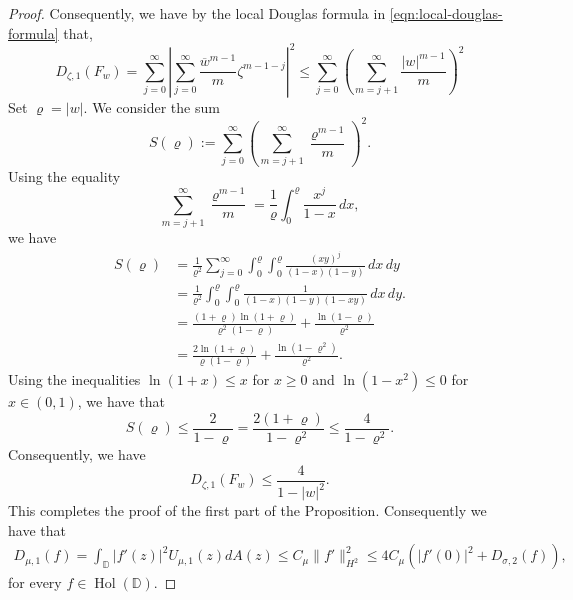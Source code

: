 \documentclass[10pt,oneside,reqno]{amsart}
\theoremstyle{definition}
\theoremstyle{remark}
\newcommand{\abs}[1]{\left\lvert #1 \right\rvert}
\renewcommand{\le}{\leqslant}
\renewcommand{\ge}{\geqslant}
\newcommand{\D}{\mathbb D}
\numberwithin{equation}{section}
\begin{document}
\begin{proof}
Consequently, we have by the local Douglas formula in \eqref{eqn:local-douglas-formula} that,
\begin{equation*}
    D_{\zeta,1}(F_w) =\sum_{j=0}^{\infty} \abs{\sum_{j=0}^{\infty} \frac{\overline{w}^{m-1}}{m} \zeta^{m-1-j}}^2 \le \sum_{j=0}^{\infty} \left( \sum_{m=j+1}^{\infty} \frac{\abs{w}^{m-1}}{m} \right)^2
\end{equation*}
Set $\varrho = |w|$. We consider the sum
\begin{equation*}
    S(\varrho) := \sum_{j=0}^{\infty} \left( \sum_{m=j+1}^{\infty} \frac{\varrho^{m-1}}{m} \right)^2.
\end{equation*}
Using the equality
\begin{equation*}
    \sum_{m=j+1}^{\infty} \frac{\varrho^{m-1}}{m} = \frac{1}{\varrho} \int_{0}^{\varrho} \frac{x^j}{1-x} \, dx,
\end{equation*}
we have
\begin{align*}
    S(\varrho) &= \frac{1}{\varrho^2} \sum_{j=0}^{\infty} \int_{0}^{\varrho} \int_{0}^{\varrho} \frac{(xy)^j}{(1-x)(1-y)} \, dx\, dy\\
    &= \frac{1}{\varrho^2} \int_{0}^{\varrho} \int_{0}^{\varrho} \frac{1}{(1-x)(1-y)(1-xy)} \, dx\, dy. \\
    &= \frac{(1+\varrho) \ln(1+\varrho)}{\varrho^2(1-\varrho)} + \frac{\ln(1-\varrho)}{ \varrho ^2}\\
    &= \frac{2 \ln (1+\varrho) }{\varrho(1-\varrho)} +  \frac{\ln(1-\varrho^2)}{ \varrho ^2}.
\end{align*}
Using the inequalities $\ln (1+x) \le x$ for $x \ge 0$ and $\ln (1- x^2) \le 0$ for $x \in (0,1)$, we have that 
\begin{equation*}
    S (\varrho) \le \frac{2}{1-\varrho} = \frac{2 (1+\varrho)}{1-\varrho^2} \le \frac{4}{1-\varrho^2}.
\end{equation*}
Consequently, we have
\begin{equation*}
    D_{\zeta, 1} (F_w) \le \frac{4}{1-\abs{w}^2}.
\end{equation*}
This completes the proof of the first part of the Proposition. Consequently we have that
\begin{align*}
    D_{\mu,1}(f) = \int_{\D}|f'(z)|^2 U_{\mu,1} (z)dA(z) \leqslant C_{\mu} \|f'\|_{H^2}^2 \leqslant 4C_{\mu} \left ( |f'(0)|^2 + D_{\sigma,2}(f) \right),
\end{align*}
 for every $f\in\operatorname{Hol}(\D).$
\end{proof}

 
\end{document}
